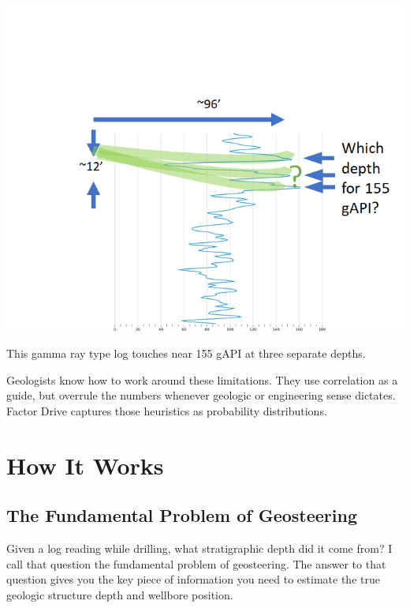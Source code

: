 \documentclass{tufte-handout}
\begin{document}
\begin{marginfigure}
  \includegraphics{which-depth-for-155-gapi.png}
  \caption{This gamma ray type log touches near 155 gAPI at three separate depths.}
  \label{fig:which-depth-for-155-gapi}
\end{marginfigure}

Geologists know how to work around these limitations. They use correlation as a guide, but overrule the numbers whenever geologic or engineering sense dictates. Factor Drive captures those heuristics as probability distributions.

\section{How It Works}\label{sec:how-it-doesnt-work}
\subsection{The Fundamental Problem of Geosteering}\label{sec:fundamental-problem}

Given a log reading while drilling, what stratigraphic depth did it come from? I call that question the 
fundamental problem of geosteering. The answer to that question gives you the key piece of information you need
to estimate the true geologic structure depth and wellbore position.
\end{document}

